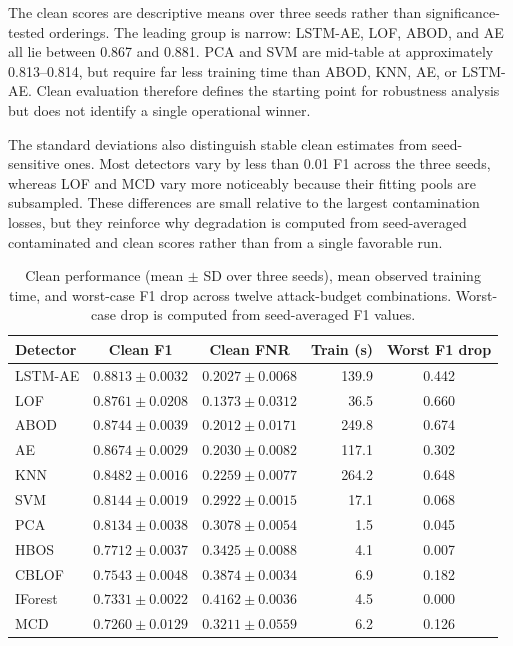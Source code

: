 \documentclass[10pt,conference]{IEEEtran}
\begin{document}
The clean scores are descriptive means over three seeds rather than significance-tested orderings. The leading group is narrow: LSTM-AE, LOF, ABOD, and AE all lie between 0.867 and 0.881. PCA and SVM are mid-table at approximately 0.813--0.814, but require far less training time than ABOD, KNN, AE, or LSTM-AE. Clean evaluation therefore defines the starting point for robustness analysis but does not identify a single operational winner.

The standard deviations also distinguish stable clean estimates from seed-sensitive ones. Most detectors vary by less than 0.01 F1 across the three seeds, whereas LOF and MCD vary more noticeably because their fitting pools are subsampled. These differences are small relative to the largest contamination losses, but they reinforce why degradation is computed from seed-averaged contaminated and clean scores rather than from a single favorable run.

\begin{table}[t]
\caption{Clean performance (mean $\pm$ SD over three seeds), mean observed training time, and worst-case F1 drop across twelve attack-budget combinations. Worst-case drop is computed from seed-averaged F1 values.}
\label{tab:main_results}
\centering
\scriptsize
\setlength{\tabcolsep}{5pt}
\begin{tabular}{|l|c|c|r|c|}
\hline
\textbf{Detector} & \textbf{Clean F1} & \textbf{Clean FNR} & \textbf{Train (s)} & \textbf{Worst F1 drop} \\
\hline
LSTM-AE & $0.8813 \pm 0.0032$ & $0.2027 \pm 0.0068$ & 139.9 & 0.442 \\
LOF & $0.8761 \pm 0.0208$ & $0.1373 \pm 0.0312$ & 36.5 & 0.660 \\
ABOD & $0.8744 \pm 0.0039$ & $0.2012 \pm 0.0171$ & 249.8 & 0.674 \\
AE & $0.8674 \pm 0.0029$ & $0.2030 \pm 0.0082$ & 117.1 & 0.302 \\
KNN & $0.8482 \pm 0.0016$ & $0.2259 \pm 0.0077$ & 264.2 & 0.648 \\
SVM & $0.8144 \pm 0.0019$ & $0.2922 \pm 0.0015$ & 17.1 & 0.068 \\
PCA & $0.8134 \pm 0.0038$ & $0.3078 \pm 0.0054$ & 1.5 & 0.045 \\
HBOS & $0.7712 \pm 0.0037$ & $0.3425 \pm 0.0088$ & 4.1 & 0.007 \\
CBLOF & $0.7543 \pm 0.0048$ & $0.3874 \pm 0.0034$ & 6.9 & 0.182 \\
IForest & $0.7331 \pm 0.0022$ & $0.4162 \pm 0.0036$ & 4.5 & 0.000 \\
MCD & $0.7260 \pm 0.0129$ & $0.3211 \pm 0.0559$ & 6.2 & 0.126 \\
\hline
\end{tabular}
\end{table}
\end{document}
